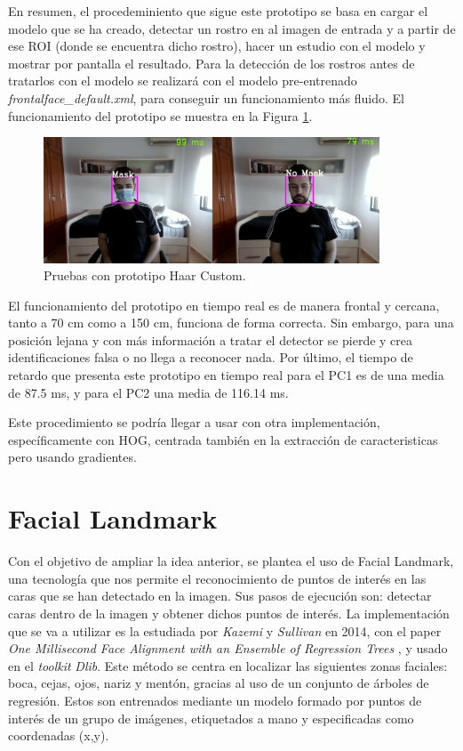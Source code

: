 En resumen, el procedeminiento que sigue este prototipo se basa en cargar el modelo que se ha creado, detectar un rostro en al imagen de entrada y a partir de ese ROI (donde se encuentra dicho rostro), hacer un estudio con el modelo y mostrar por pantalla el resultado. Para la detección de los rostros antes de tratarlos con el modelo se realizará con el modelo pre-entrenado \textit{frontalface\_default.xml}, para conseguir un funcionamiento más fluido. El funcionamiento del prototipo se muestra en la Figura \ref{fig:haarCustom}.

\begin{figure}[htp]
	\centering
	\includegraphics[width=10cm]{imagenes/haarcustom_prueba.png}
	\caption{Pruebas con prototipo Haar Custom.}
	\label{fig:haarCustom}
\end{figure}

\vspace{-0.3cm}
El funcionamiento del prototipo en tiempo real es de manera frontal y cercana, tanto a 70 cm como a 150 cm, funciona de forma correcta. Sin embargo, para una posición lejana y con más información a tratar el detector se pierde y crea identificaciones falsa o no llega a reconocer nada. Por último, el tiempo de retardo que presenta este prototipo en tiempo real para el PC1 es de una media de 87.5 ms, y para el PC2 una media de 116.14 ms.

Este procedimiento se podría llegar a usar con otra implementación, específicamente con HOG, centrada también en la extracción de caracteristicas pero usando gradientes.

\newpage
\section{Facial Landmark}
\vspace{-0.7cm}
Con el objetivo de ampliar la idea anterior, se plantea el uso de Facial Landmark, una tecnología que nos permite el reconocimiento de puntos de interés en las caras que se han detectado en la imagen. Sus pasos de ejecución son: detectar caras dentro de la imagen y obtener dichos puntos de interés. La implementación que se va a utilizar es la estudiada por \textit{Kazemi} y \textit{Sullivan} en 2014, con el paper \textit{One Millisecond Face Alignment with an Ensemble of Regression Trees} \cite{inproceedings}, y usado en el \textit{toolkit} \textit{Dlib}. Este método se centra en localizar las siguientes zonas faciales: boca, cejas, ojos, nariz y mentón, gracias al uso de un conjunto de árboles de regresión. Estos son entrenados mediante  un modelo formado por puntos de interés de un grupo de imágenes, etiquetados a mano y especificadas como coordenadas (x,y). 

